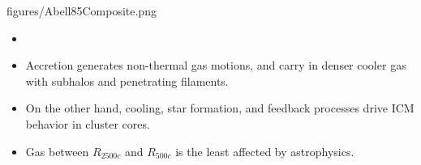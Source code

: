 \documentclass[landscape,a0paper,fontscale=0.285]{baposter} %
\begin{document}
\begin{poster}
{\begin{multicols}{2}
\begin{center}
\begin{tikzonimage}[width=\columnwidth, trim=0 120 500 600, clip]{figures/Abell85Composite.png}
    \end{tikzonimage}
\end{center}
\begin{center}
\begin{itemize}
\alignleft
\item[]
\item {\Large Accretion generates non-thermal gas motions, and carry
  in denser cooler gas with subhalos and penetrating filaments.}
\item {\Large On the other hand, cooling, star formation, and feedback
  processes drive ICM behavior in cluster cores.}
\item {\Large Gas between $R_{2500c}$ and $R_{500c}$ is the least
  affected by astrophysics.}

\end{itemize}
\end{center}
\end{multicols}
}




\end{poster}
\end{document}
